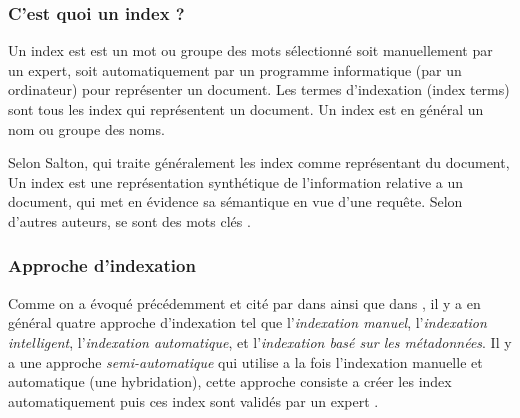\subsubsection{C'est quoi un index ?}
Un index est est un mot ou groupe des mots sélectionné soit manuellement par un expert, soit automatiquement par un programme informatique (par un ordinateur) pour représenter un document. Les termes d'indexation (index terms) sont tous les index qui représentent un document. Un index est en général un nom ou groupe des noms.

Selon Salton, qui traite généralement les index comme représentant du document, Un index est une représentation synthétique de l'information relative a un document, qui met en évidence sa sémantique en vue d'une requête. Selon d'autres auteurs, se sont des mots clés \citep{paradis:tel-00005009}.

\subsubsection{Approche d'indexation}
Comme on a évoqué précédemment et cité par dans \citep{ir-on-web} ainsi que dans \citep{amelioration-ri-approche-semantique}, il y a en général quatre approche d'indexation tel que l'\textit{indexation manuel}, l'\textit{indexation intelligent}, l’\textit{indexation automatique}, et l'\textit{indexation basé sur les métadonnées}. Il y a une approche \textit{semi-automatique} qui utilise a la fois l'indexation manuelle et automatique (une hybridation), cette approche consiste a créer les index automatiquement puis ces index sont validés par un expert \citep{paradis:tel-00005009}.

